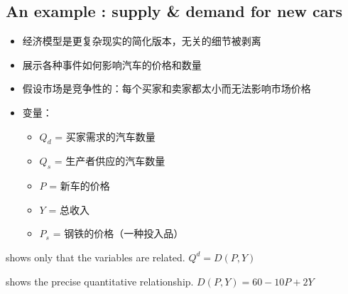 \documentclass[lang=cn,10pt,green]{elegantbook}
\begin{document}
\subsection{An example : supply & demand for new cars}
\begin{itemize}
    \item 经济模型是更复杂现实的简化版本，无关的细节被剥离
    \item 展示各种事件如何影响汽车的价格和数量
    \item 假设市场是竞争性的：每个买家和卖家都太小而无法影响市场价格
    \item 变量：
    \begin{itemize}
        \item $Q_d$ = 买家需求的汽车数量
        \item $Q_s$ = 生产者供应的汽车数量
        \item $P$ = 新车的价格
        \item $Y$ = 总收入
        \item $P_s$ = 钢铁的价格（一种投入品）
    \end{itemize}
\end{itemize}

\begin{definition}
    shows only that the variables are related. $Q^d = D(P,Y)$
\end{definition}
\begin{definition}
    shows the precise quantitative relationship. $D(P,Y) = 60-10P+2Y$
\end{definition}
\end{document}
